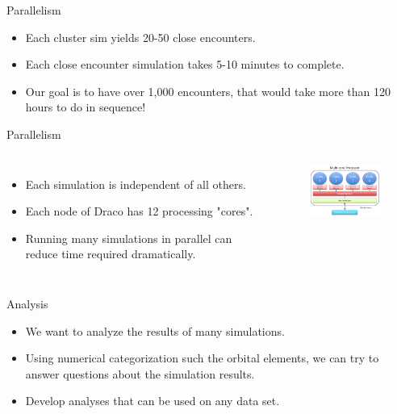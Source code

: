 \documentclass{beamer}
\begin{document}
\begin{frame}{Parallelism}
    \begin{itemize}
        \item Each cluster sim yields 20-50 close encounters.
        \item Each close encounter simulation takes 5-10 minutes to
            complete.
        \item Our goal is to have over 1,000 encounters, that would take
            more than 120 hours to do in sequence!
    \end{itemize}
\end{frame}

\begin{frame}{Parallelism}
    \begin{columns}
        \begin{itemize}
            \item Each simulation is independent of all others.
            \item Each node of Draco has 12 processing "cores".
            \item Running many simulations in parallel can reduce
                time required dramatically.
        \end{itemize}
        \begin{figure}
            \centering
            \includegraphics[width=1.5in]{multicore}
        \end{figure}
    \end{columns}
\end{frame}


\begin{frame}{Analysis}
    \begin{itemize}
        \item We want to analyze the results of many
            simulations.
        \item Using numerical categorization such the orbital elements,
            we can try to answer questions about the simulation results.
        \item Develop analyses that can be used on any data set.
    \end{itemize}
\end{frame}
\end{document}
